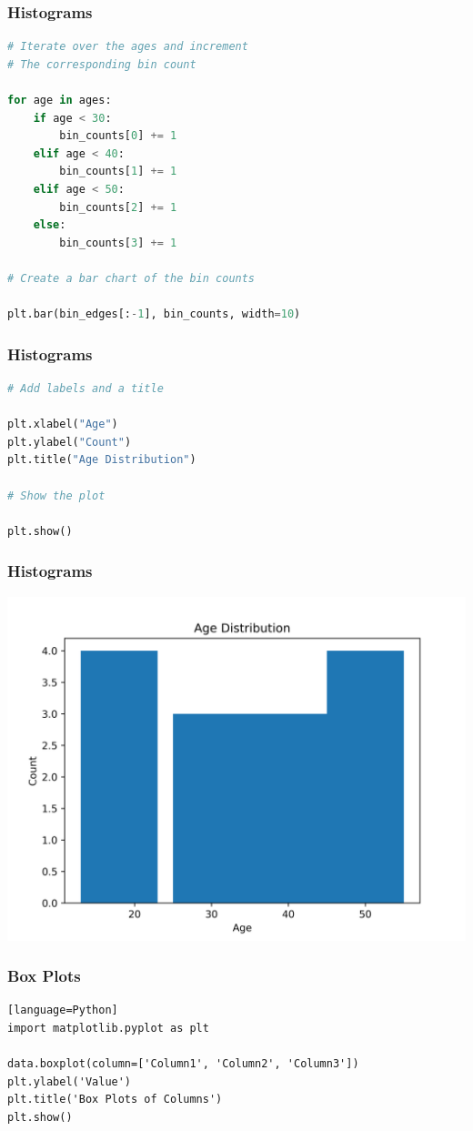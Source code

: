 \documentclass{beamer}
\begin{document}
\begin{frame}[fragile]
\frametitle{Histograms}
\begin{lstlisting}[language=Python]
# Iterate over the ages and increment
# The corresponding bin count

for age in ages:
    if age < 30:
        bin_counts[0] += 1
    elif age < 40:
        bin_counts[1] += 1
    elif age < 50:
        bin_counts[2] += 1
    else:
        bin_counts[3] += 1

# Create a bar chart of the bin counts

plt.bar(bin_edges[:-1], bin_counts, width=10)
\end{lstlisting}
\end{frame}

\begin{frame}[fragile]
\frametitle{Histograms}
\begin{lstlisting}[language=Python]
# Add labels and a title

plt.xlabel("Age")
plt.ylabel("Count")
plt.title("Age Distribution")

# Show the plot

plt.show()
\end{lstlisting}
\end{frame}

\begin{frame}
\frametitle{Histograms}
\begin{center}
\includegraphics[width=0.7\linewidth]{figures/histogram_example_custom}
\end{center}
\end{frame}

\begin{frame}[fragile]
\frametitle{Box Plots}
\begin{lstlisting}[caption=Creating box plots of data in each column using Pandas and Matplotlib][language=Python]
import matplotlib.pyplot as plt

data.boxplot(column=['Column1', 'Column2', 'Column3'])
plt.ylabel('Value')
plt.title('Box Plots of Columns')
plt.show()
\end{lstlisting}
\end{frame}
\end{document}
